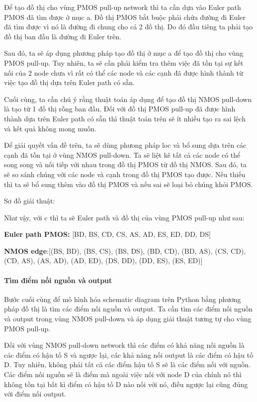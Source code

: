 \documentclass[a4paper,12pt]{article}
\begin{document}
\begin{enumerate}[label=\alph*.]
Để tạo đồ thị cho vùng PMOS pull-up network thì ta cần dựa vào Euler path PMOS 
đã tìm được ở mục a. Đồ thị PMOS bắt buộc phải chứa đường đi Euler đã tìm được vì nó 
là đường đi chung cho cả 2 đồ thị. Do đó đầu tiêng ta phải tạo đồ thị ban đầu 
là đường đi Euler trên.

Sau đó, ta sẽ áp dụng phương pháp tạo đồ thị ở mục a để  tạo đồ thị cho vùng 
PMOS pull-up. Tuy nhiên, ta sẽ cần phải kiểm tra thêm việc đã tồn tại sự kết nối
của 2 node chưa vì rất có thể các node và các cạnh đã được hình thành từ việc tạo đồ thị
dựa trên Euler path có sẵn.

Cuối cùng, ta cần chú ý rằng thuật toán áp dụng để tạo đồ thị NMOS pull-down là tạo 
từ 1 đồ thị rỗng ban đầu. Đối với đồ thị PMOS pull-up đã được hình thành dựa trên 
Euler path có sẵn thì thuật toán trên sẽ ít nhiều tạo ra sai lệch và kết quả không mong muốn.

Để giải quyết vấn đề trên, ta sẽ dùng phưong pháp loc và bổ sung dựa trên các cạnh đã tồn tại
ở vùng NMOS pull-down. Ta sẽ liệt kê tất cả các node có thể song song và nối tiếp với nhau trong đồ thị
PMOS từ đồ thị NMOS. Sau đó, ta sẽ so sánh chúng với các node và cạnh trong đồ thị PMOS tạo được. 
Nếu thiếu thì ta sẽ bổ sung thêm vào đồ thị PMOS và nếu sai sẽ loại bỏ chúng khỏi PMOS.

Sơ đồ giải thuật:

Như vậy, với c thì ta sẽ Euler path và đồ thị của vùng PMOS pull-up như sau:

\textbf{Euler path PMOS: } [BD, BS, CD, CS, AS, AD, ES, ED, DD, DS]

\textbf{NMOS edge}:[(BS, BD), (BS, CS), (BS, DS), (BD, CD), (BD, AS), (CS, CD),
(CD, AS), (AS, AD), (AD, ED), (DS, DD), (DD, ES), (ES, ED)]

\end{enumerate}
\paragraph{Tìm điểm nối nguồn và output}
Bước cuối cùng để mô hình hóa schematic diagram trên Python bằng phương pháp đồ thị 
là tìm các điểm nối nguồn và output. Ta cần tìm các điểm nối nguồn và output trong vùng 
NMOS pull-down và áp dụng giải thuật tương tự cho vùng PMOS pull-up.

Đối với vùng NMOS pull-down network thì các điểm có khả năng nối nguồn là các điểm có hậu tố S 
và ngược lại, các khả năng nối output là các điểm có hậu tố D. Tuy nhiên, không phải tất cả các 
điểm hậu tố S sẽ là các điểm nối với nguồn. Các điểm nối nguồn sẽ là điểm mà ngoài việc nối với node D
của chính nó thì không tồn tại bất kì điểm có hậu tố D nào nối với nó, điều ngược lại cũng đúng
với điểm nối output.
\end{document}

